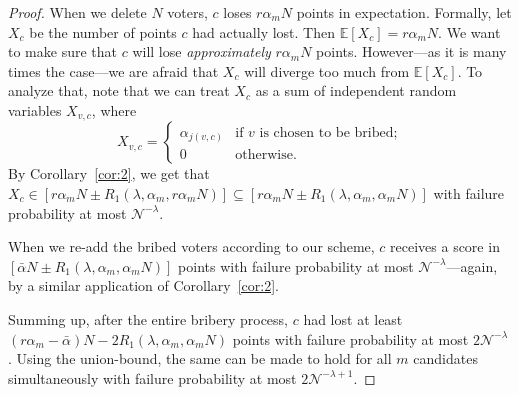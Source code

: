 \documentclass[letterpaper]{article} %
\theoremstyle{definition}
\newcommand{\NN}{\mathcal{N}}
\newcommand{\EE}{\mathbb{E}}
\begin{document}
\begin{proof}
	When we delete $N$ voters, $c$ loses $r \alpha_m N$ points in expectation. Formally, let $X_c$ be the number of points $c$ had actually lost. Then $\EE[X_c] = r\alpha_m N $. We want to make sure that $c$ will lose \emph{approximately} $r\alpha_m N$ points.
	However---as it is many times the case---we are afraid that $X_c$ will diverge too much from $\EE[X_c]$. To analyze that, note that we can treat $X_c$ as a sum of independent random variables $X_{v,c}$, where
	\begin{equation*}
	X_{v,c} =
	\begin{cases}
	\alpha_{j(v,c)} & \text{if $v$ is chosen to be bribed;} \\
	0 & \text{otherwise.}
	\end{cases}
	\end{equation*}
	By Corollary~\ref{cor:2}, we get that $X_c \in [r\alpha_mN \pm R_1(\lambda, \alpha_{m}, r\alpha_m N) ] \subseteq [r\alpha_mN \pm R_1(\lambda, \alpha_{m}, \alpha_m N)]$ with failure probability at most $\NN^{-\lambda}$.


	When we re-add the bribed voters according to our scheme, $c$ receives a score in $[\bar{\alpha} N \pm R_1(\lambda, \alpha_{m}, \alpha_m N)]$ points with failure probability at most $\NN^{-\lambda}$---again, by a similar application of Corollary~\ref{cor:2}.

Summing up, after the entire bribery process, $c$ had lost at least $(r\alpha_m - \bar{\alpha})N-2R_1(\lambda, \alpha_{m}, \alpha_m N)$ points with failure probability at most $2\NN^{-\lambda}$. Using the union-bound, the same can be made to hold for all $m$ candidates simultaneously with failure probability at most $2\NN^{-\lambda+1}$.




\end{proof}
\end{document}
